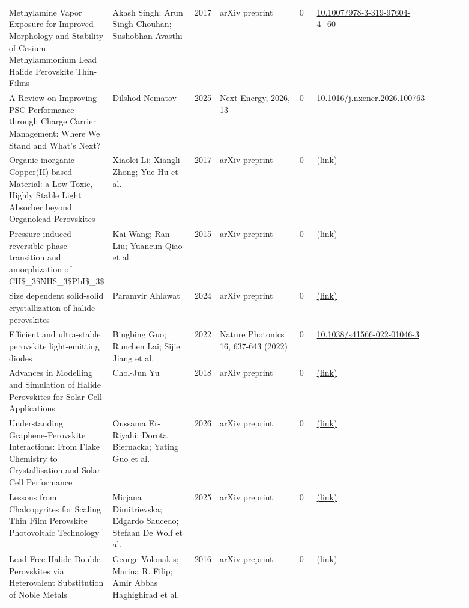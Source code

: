 \documentclass[10pt,a4paper]{article}
\begin{document}
{\begin{longtable}{p{0.197\linewidth}p{0.197\linewidth}p{0.043\linewidth}p{0.197\linewidth}p{0.043\linewidth}p{0.117\linewidth}p{0.098\linewidth}}
Methylamine Vapor Exposure for Improved Morphology and Stability of Cesium-Methylammonium Lead Halide Perovskite Thin-Films & Akash Singh; Arun Singh Chouhan; Sushobhan Avasthi & 2017 & arXiv preprint & 0 & \href{https://doi.org/10.1007/978-3-319-97604-4_60}{10.1007/978-3-319-97604-4\_60} &  \\
A Review on Improving PSC Performance through Charge Carrier Management: Where We Stand and What's Next? & Dilshod Nematov & 2025 & Next Energy, 2026, 13 & 0 & \href{https://doi.org/10.1016/j.nxener.2026.100763}{10.1016/j.nxener.2026.100763} &  \\
Organic-inorganic Copper(II)-based Material: a Low-Toxic, Highly Stable Light Absorber beyond Organolead Perovskites & Xiaolei Li; Xiangli Zhong; Yue Hu et al. & 2017 & arXiv preprint & 0 & \href{http://arxiv.org/abs/1703.02401v2}{(link)} &  \\
Pressure-induced reversible phase transition and amorphization of CH\$\_3\$NH\$\_3\$PbI\$\_3\$ & Kai Wang; Ran Liu; Yuancun Qiao et al. & 2015 & arXiv preprint & 0 & \href{http://arxiv.org/abs/1509.03717v1}{(link)} &  \\
Size dependent solid-solid crystallization of halide perovskites & Paramvir Ahlawat & 2024 & arXiv preprint & 0 & \href{http://arxiv.org/abs/2404.05644v1}{(link)} &  \\
Efficient and ultra-stable perovskite light-emitting diodes & Bingbing Guo; Runchen Lai; Sijie Jiang et al. & 2022 & Nature Photonics 16, 637-643 (2022) & 0 & \href{https://doi.org/10.1038/s41566-022-01046-3}{10.1038/s41566-022-01046-3} &  \\
Advances in Modelling and Simulation of Halide Perovskites for Solar Cell Applications & Chol-Jun Yu & 2018 & arXiv preprint & 0 & \href{http://arxiv.org/abs/1811.00702v1}{(link)} &  \\
Understanding Graphene-Perovskite Interactions: From Flake Chemistry to Crystallisation and Solar Cell Performance & Oussama Er-Riyahi; Dorota Biernacka; Yating Guo et al. & 2026 & arXiv preprint & 0 & \href{http://arxiv.org/abs/2609.02744v1}{(link)} &  \\
Lessons from Chalcopyrites for Scaling Thin Film Perovskite Photovoltaic Technology & Mirjana Dimitrievska; Edgardo Saucedo; Stefaan De Wolf et al. & 2025 & arXiv preprint & 0 & \href{http://arxiv.org/abs/2508.11638v2}{(link)} &  \\
Lead-Free Halide Double Perovskites via Heterovalent Substitution of Noble Metals & George Volonakis; Marina R. Filip; Amir Abbas Haghighirad et al. & 2016 & arXiv preprint & 0 & \href{http://arxiv.org/abs/1603.01585v1}{(link)} &  \\

\end{longtable}}
\end{document}
